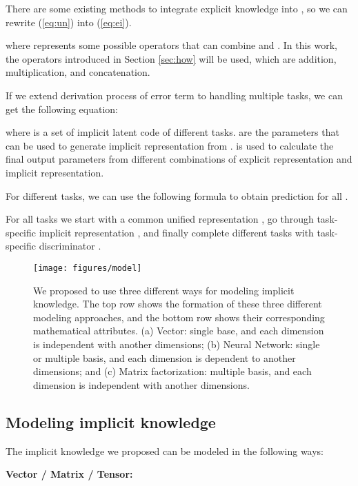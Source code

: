 \documentclass[10pt,twocolumn,letterpaper]{article}
\begin{document}
There are some existing methods to integrate explicit knowledge into , so we can rewrite (\ref{eq:un}) into (\ref{eq:ei}).


where  represents some possible operators that can combine  and . In this work, the operators introduced in Section \ref{sec:how} will be used, which are addition, multiplication, and concatenation.

If we extend derivation process of error term to handling multiple tasks, we can get the following equation:


where  is a set of implicit latent code of  different tasks.  are the parameters that can be used to generate implicit representation from .  is used to calculate the final output parameters from different combinations of explicit representation and implicit representation.

For different tasks, we can use the following formula to obtain prediction for all . 



For all tasks we start with a common unified representation , go through task-specific implicit representation , and finally complete different tasks with task-specific discriminator .

\begin{figure*}[t]
	\begin{center}
		\texttt{[image: figures/model]}
	\end{center}
	\caption{We proposed to use three different ways for modeling implicit knowledge. The top row shows the formation of these three different modeling approaches, and the bottom row shows their corresponding mathematical attributes. (a) Vector: single base, and each dimension is independent with another dimensions; (b) Neural Network: single or multiple basis, and each dimension is dependent to another dimensions; and (c) Matrix factorization: multiple basis, and each dimension is independent with another dimensions.}
	\label{fig:mod}
\end{figure*}

\newpage

\subsection{Modeling implicit knowledge}
\label{sec:mik}

The implicit knowledge we proposed can be modeled in the following ways:

\noindent
\textbf{Vector / Matrix / Tensor:}
\end{document}
